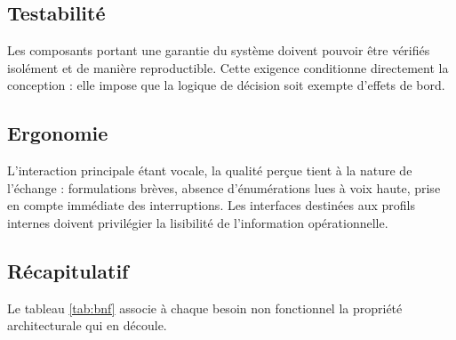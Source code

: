 \subsection{Testabilité}

Les composants portant une garantie du système doivent pouvoir être vérifiés isolément et de manière reproductible. Cette exigence conditionne directement la conception : elle impose que la logique de décision soit exempte d'effets de bord.

\subsection{Ergonomie}

L'interaction principale étant vocale, la qualité perçue tient à la nature de l'échange : formulations brèves, absence d'énumérations lues à voix haute, prise en compte immédiate des interruptions. Les interfaces destinées aux profils internes doivent privilégier la lisibilité de l'information opérationnelle.

\subsection{Récapitulatif}

Le tableau \ref{tab:bnf} associe à chaque besoin non fonctionnel la propriété architecturale qui en découle.

